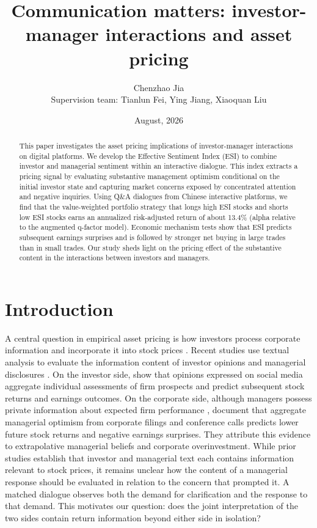 \documentclass[12pt]{article}
\date{August, 2026}
\title{Communication matters: investor-manager interactions and asset pricing}
\author{
Chenzhao Jia\\[0.3em]
\small Supervision team: Tianlun Fei, Ying Jiang, Xiaoquan Liu}
\begin{document}
\maketitle
\begin{abstract}
This paper investigates the asset pricing implications of investor-manager interactions on digital platforms. We develop the Effective Sentiment Index (ESI) to combine investor and managerial sentiment within an interactive dialogue. This index extracts a pricing signal by evaluating substantive management optimism conditional on the initial investor state and capturing market concerns exposed by concentrated attention and negative inquiries. Using Q\&A dialogues from Chinese interactive platforms, we find that the value-weighted portfolio strategy that longs high ESI stocks and shorts low ESI stocks earns an annualized risk-adjusted return of about 13.4\% (alpha relative to the augmented q-factor model). Economic mechanism tests show that ESI predicts subsequent earnings surprises and is followed by stronger net buying in large trades than in small trades. Our study sheds light on the pricing effect of the substantive content in the interactions between investors and managers.
\end{abstract}


\section{Introduction}\label{sec:introduction}

A central question in empirical asset pricing is how investors process corporate information and incorporate it into stock prices \citep{blankespoor2020}. Recent studies use textual analysis to evaluate the information content of investor opinions and managerial disclosures \citep{bartov2018,chen2014,cookson2024,jiang2019}. On the investor side, \citet{chen2014} show that opinions expressed on social media aggregate individual assessments of firm prospects and predict subsequent stock returns and earnings outcomes. On the corporate side, although managers possess private information about expected firm performance \citep{beyer2010financial,healy2001information}, \citet{jiang2019} document that aggregate managerial optimism from corporate filings and conference calls predicts lower future stock returns and negative earnings surprises. They attribute this evidence to extrapolative managerial beliefs and corporate overinvestment. While prior studies establish that investor and managerial text each contains information relevant to stock prices, it remains unclear how the content of a managerial response should be evaluated in relation to the concern that prompted it. A matched dialogue observes both the demand for clarification and the response to that demand. This motivates our question: does the joint interpretation of the two sides contain return information beyond either side in isolation?
\end{document}
